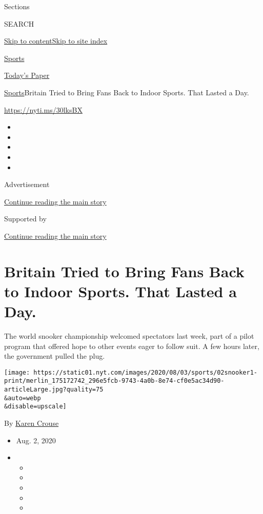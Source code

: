 Sections

SEARCH

\protect\hyperlink{site-content}{Skip to
content}\protect\hyperlink{site-index}{Skip to site index}

\href{https://www.nytimes.com/section/sports}{Sports}

\href{https://myaccount.nytimes.com/auth/login?response_type=cookie\&client_id=vi}{}

\href{https://www.nytimes.com/section/todayspaper}{Today's Paper}

\href{/section/sports}{Sports}\textbar{}Britain Tried to Bring Fans Back
to Indoor Sports. That Lasted a Day.

\url{https://nyti.ms/30lksBX}

\begin{itemize}
\item
\item
\item
\item
\item
\end{itemize}

Advertisement

\protect\hyperlink{after-top}{Continue reading the main story}

Supported by

\protect\hyperlink{after-sponsor}{Continue reading the main story}

\hypertarget{britain-tried-to-bring-fans-back-to-indoor-sports-that-lasted-a-day}{%
\section{Britain Tried to Bring Fans Back to Indoor Sports. That Lasted
a
Day.}\label{britain-tried-to-bring-fans-back-to-indoor-sports-that-lasted-a-day}}

The world snooker championship welcomed spectators last week, part of a
pilot program that offered hope to other events eager to follow suit. A
few hours later, the government pulled the plug.

\texttt{[image: https://static01.nyt.com/images/2020/08/03/sports/02snooker1-print/merlin\_175172742\_296e5fcb-9743-4a0b-8e74-cf0e5ac34d90-articleLarge.jpg?quality=75\\\&auto=webp\\\&disable=upscale]}

By \href{https://www.nytimes.com/by/karen-crouse}{Karen Crouse}

\begin{itemize}
\item
  Aug. 2, 2020
\item
  \begin{itemize}
  \item
  \item
  \item
  \item
  \item
  \end{itemize}
\end{itemize}

